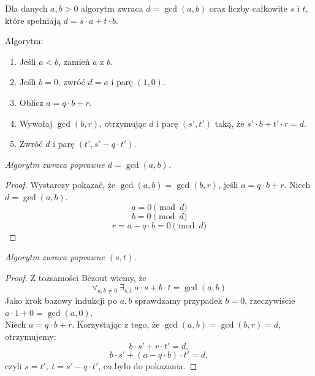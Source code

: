 Dla danych \( a, b > 0 \) algorytm zwraca \( d = \gcd(a,b) \) oraz liczby całkowite \( s \) i \( t \), które spełniają \( d = s\cdot a + t\cdot b \).

\begin{greyframe}
    Algorytm:
    \begin{enumerate}
        \item Jeśli \( a < b \), zamień \( a \) z \( b \).
        \item Jeśli \( b = 0 \), zwróć \( d = a \) i parę \( (1,0) \).
        \item Oblicz \( a = q \cdot b + r \).
        \item Wywołaj \( \gcd(b,r) \), otrzymując \( d \) i parę \( (s', t') \) taką, że \( s'\cdot b + t' \cdot r = d \).
        \item Zwróć \( d \) i parę \( (t', s' - q \cdot t') \).
    \end{enumerate}
\end{greyframe}

\vspace{1em}\noindent
\textit{Algorytm zwraca poprawne \( d = \gcd(a, b) \).}
\begin{proof}
    Wystarczy pokazać, że \( \gcd(a, b) = \gcd(b, r) \), jeśli \( a = q \cdot b + r \). Niech \( d = \gcd(a, b) \).
    \[
        a = 0 \pmod{d}
    \]
    \[
        b = 0 \pmod{d}
    \]
    \[
        r = a - q \cdot b = 0 \pmod{d}
    \]
\end{proof}
\textit{Algorytm zwraca poprawne \( (s, t) \).}
\begin{proof}
    Z tożsamości B\'ezout wiemy, że
    \[
        \forall_{a, b \not= 0 } \ \exists_{s, t} \ a \cdot s + b \cdot t = \gcd(a, b)
    \]
    Jako krok bazowy indukcji po \( a, b \) sprawdzamy przypadek \( b = 0 \), rzeczywiście \( a \cdot 1 + 0 = \gcd(a, 0) \). \\
    Niech \( a = q \cdot b + r \). Korzystając z tego, że \( \gcd(a, b) = \gcd(b, r) = d \), otrzymujemy:
    \[
        b \cdot s' + r \cdot t' = d,
    \]
    \[
        b \cdot s' + (a - q \cdot b) \cdot t' = d,
    \]
    czyli \( s = t', \ t = s' - q \cdot t' \), co było do pokazania.
\end{proof}

